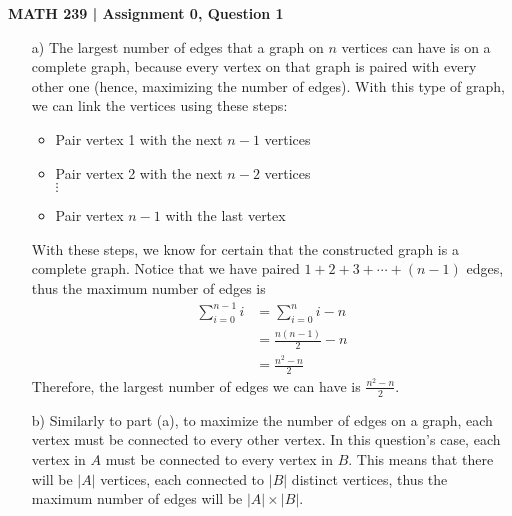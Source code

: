\documentclass{report}
\begin{document}
\textbf{MATH 239 | Assignment 0, Question 1}
\begin{enumerate}
\item[a)] The largest number of edges that a graph on $n$ vertices can have is on a complete graph, because every vertex on that graph is paired with every other one (hence, maximizing the number of edges). With this type of graph, we can link the vertices using these steps:
\begin{itemize}
\item Pair vertex 1 with the next $n-1$ vertices
\item Pair vertex 2 with the next $n-2$ vertices \\
$\vdots$
\item Pair vertex $n-1$ with the last vertex
\end{itemize}
With these steps, we know for certain that the constructed graph is a complete graph. Notice that we have paired $1 + 2 + 3 + \cdots + (n-1)$ edges, thus the maximum number of edges is
\begin{align*}
\sum_{i=0}^{n-1} i &= \sum_{i=0}^n i - n \\
&= \frac{n(n-1)}{2} - n \\
&= \frac{n^2 - n}{2}
\end{align*}
Therefore, the largest number of edges we can have is $\displaystyle \frac{n^2 - n}{2}$.

\item[b)] Similarly to part (a), to maximize the number of edges on a graph, each vertex must be connected to every other vertex. In this question's case, each vertex in $A$ must be connected to every vertex in $B$. This means that there will be $\lvert A \rvert$ vertices, each connected to $\lvert B \rvert$ distinct vertices, thus the maximum number of edges will be $\lvert A \rvert \times \lvert B \rvert$.
\end{enumerate}
\end{document}
